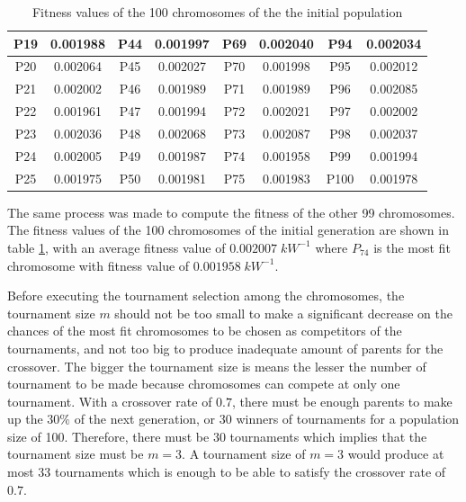\begin{table}[h]
\begin{tabular}{|cc|cc|cc|cc|}
            P19 & 0.001988 & P44 & 0.001997 & P69 & 0.002040 & P94 & 0.002034 \\ \hline
            P20 & 0.002064 & P45 & 0.002027 & P70 & 0.001998 & P95 & 0.002012 \\ \hline
            P21 & 0.002002 & P46 & 0.001989 & P71 & 0.001989 & P96 & 0.002085 \\ \hline
            P22 & 0.001961 & P47 & 0.001994 & P72 & 0.002021 & P97 & 0.002002 \\ \hline
            P23 & 0.002036 & P48 & 0.002068 & P73 & 0.002087 & P98 & 0.002037 \\ \hline
            P24 & 0.002005 & P49 & 0.001987 & P74 & 0.001958 & P99 & 0.001994 \\ \hline
            P25 & 0.001975 & P50 & 0.001981 & P75 & 0.001983 & P100 & 0.001978 \\ \hline
        \end{tabular}
        \caption{Fitness values of the 100 chromosomes of the the initial population}
        \label{fitnessSumarry}
    \end{table}
    
    The same process was made to compute the fitness of the other 99 chromosomes. The fitness values of the 100 chromosomes of the initial generation are shown in table \ref{fitnessSumarry}, with an average fitness value of $0.002007\;kW^{-1}$ where $P_{74}$ is the most fit chromosome with fitness value of $0.001958\;kW^{-1}$.
    
    Before executing the tournament selection among the chromosomes, the tournament size $m$ should not be too small to make a significant decrease on the chances of the most fit chromosomes to be chosen as competitors of the tournaments, and not too big to produce inadequate amount of parents for the crossover. The bigger the tournament size is means the lesser the number of tournament to be made because chromosomes can compete at only one tournament. With a crossover rate of $0.7$, there must be enough parents to  make up the $30\%$ of the next generation, or 30 winners of tournaments for a population size of 100. Therefore, there must be 30 tournaments which implies that the tournament size must be $m=3$. A tournament size of $m=3$ would produce at most 33 tournaments which is enough to be able to satisfy the crossover rate of $0.7$.
    
